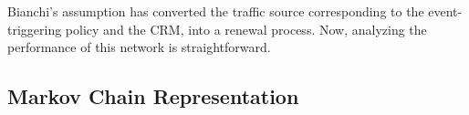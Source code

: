 \documentclass[journal]{IEEEtran}
\begin{document}
Bianchi's assumption has converted the traffic source corresponding to the event-triggering policy and the CRM, into a renewal process. Now, analyzing the performance of this network is straightforward.

\subsection{Markov Chain Representation} \label{S:MCtraffic}

\begin{figure*}[tb]
\begin{center}


\begingroup
  \makeatletter
  \providecommand\color[2][]{\errmessage{(Inkscape) Color is used for the text in Inkscape, but the package 'color.sty' is not loaded}
    \renewcommand\color[2][]{}}
  \providecommand\transparent[1]{\errmessage{(Inkscape) Transparency is used (non-zero) for the text in Inkscape, but the package 'transparent.sty' is not loaded}
    \renewcommand\transparent[1]{}}
  \providecommand\rotatebox[2]{#2}
  \ifx\svgwidth\undefined
    \setlength{\unitlength}{449.92768555pt}
  \else
    \setlength{\unitlength}{\svgwidth}
  \fi
  \global\let\svgwidth\undefined
  \makeatother

\end{center}
\end{figure*}
\end{document}
